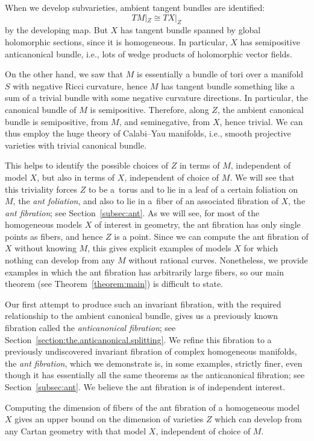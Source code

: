 \documentclass[10pt,a4paper]{amsart}
\numberwithin{equation}{section}
\begin{document}
When we develop subvarieties, ambient tangent bundles are identified:
\[
 TM|_Z \cong TX|_Z
\]
by the developing map.
But $X$ has tangent bundle spanned by global holomorphic sections, since it is homogeneous.
In particular, $X$ has semipositive anticanonical bundle, i.e., lots of wedge products of holomorphic vector fields.

On the other hand, we saw that $M$ is essentially a bundle of tori over a manifold $S$ with negative Ricci curvature,
hence $M$ has tangent bundle something like a sum of a trivial bundle with some negative curvature directions.
In particular, the canonical bundle of $M$ is semipositive.
Therefore, along $Z$, the ambient canonical bundle is semipositive, from $M$, and seminegative, from $X$, hence trivial.
We can thus employ the huge theory of Calabi--Yau manifolds, i.e., smooth projective varieties with trivial canonical bundle.

This helps to identify the possible choices of $Z$ in terms of $M$, independent of model $X$, but also in terms of $X$,
independent of choice of $M$. We will see that this triviality forces $Z$ to be a~torus and to lie in a leaf of a certain foliation on
$M$, the \emph{ant foliation}, and also to lie in a~fiber of an associated fibration of $X$, the \emph{ant fibration}; see
Section~\ref{subsec:ant}. As we will see, for most of the homogeneous models $X$ of interest in geometry, the ant fibration has only
single points as fibers, and hence $Z$ is a point. Since we can compute the ant fibration of $X$ without knowing $M$, this gives explicit
examples of models $X$ for which nothing can develop from any $M$ without rational curves. Nonetheless, we provide examples in which
the ant fibration has arbitrarily large fibers, so our main theorem (see Theorem~\ref{theorem:main}) is difficult to state.

Our first attempt to produce such an invariant fibration, with the required relationship to the ambient canonical bundle, gives us a
previously known fibration called the \emph{anticanonical fibration}; see Section~\ref{section:the.anticanonical.splitting}. We refine
this fibration to a previously undiscovered invariant fibration of complex homogeneous manifolds, the \emph{ant fibration}, which we
demonstrate is, in some examples, strictly finer, even though it has essentially all the same theorems as the anticanonical fibration; see
Section~\ref{subsec:ant}. We believe the ant fibration is of independent interest.

Computing the dimension of fibers of the ant fibration of a homogeneous model $X$ gives an upper bound on the dimension of varieties
$Z$ which can develop from any Cartan geometry with that model $X$, independent of choice of $M$.
\end{document}
